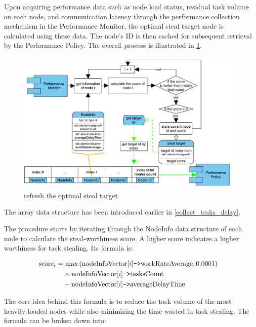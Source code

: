 \documentclass{mproj}
\begin{document}
Upon acquiring performance data such as node load status, residual task volume on each node,
and communication latency through the performance collection mechanism in the Performance Monitor,
the optimal steal target node is calculated using these data.
The node's ID is then cached for subsequent retrieval by the Performance Policy.
The overall process is illustrated in \cref{fig:refresh_target}.

\begin{figure}[h]
    \centering
    \includegraphics[width=1\textwidth]{images/refresh_target.pdf}
    \caption{refresh the optimal steal target}
    \label{fig:refresh_target}
\end{figure}
\FloatBarrier

The array data structure has been introduced earlier in \cref{collect_tesks_delay}.

The procedure starts by iterating through the NodeInfo data structure of each node to calculate the steal-worthiness score.
A higher score indicates a higher worthiness for task stealing.
Its formula is:

\begin{align}
    \text{score}_i & = \max\left(\text{nodeInfoVector}[i]\texttt{->}\text{workRateAverage}, 0.0001 \right) \notag \\
                   & \quad\times \text{nodeInfoVector}[i]\texttt{->}\text{tasksCount} \notag                      \\
                   & \quad - \text{nodeInfoVector}[i]\texttt{->}\text{averageDelayTime} \label{eq:score}
\end{align}

The core idea behind this formula is to reduce the task volume of the most heavily-loaded nodes while also minimizing the time wasted in task stealing.
The formula can be broken down into:
\end{document}
